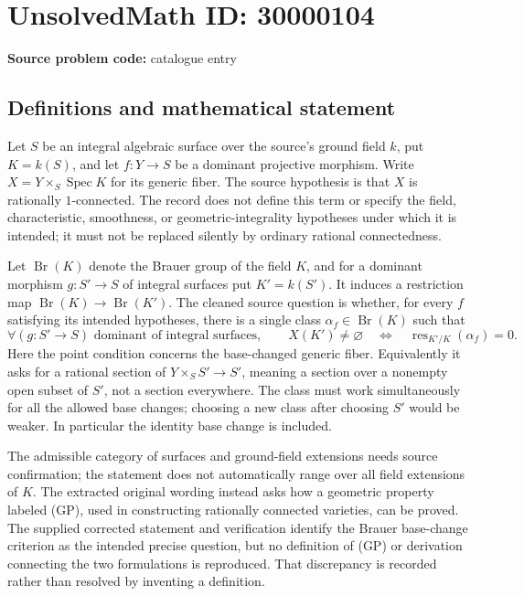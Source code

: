\documentclass[11pt]{article}
\begin{document}
\section*{UnsolvedMath ID: 30000104}
\textbf{Source problem code:} catalogue entry
\subsection{Definitions and mathematical statement}
Let \(S\) be an integral algebraic surface over the source's ground field \(k\), put \(K=k(S)\), and let \(f:Y\to S\) be a dominant projective morphism. Write \(X=Y\times_S\operatorname{Spec}K\) for its generic fiber. The source hypothesis is that \(X\) is rationally \(1\)-connected. The record does not define this term or specify the field, characteristic, smoothness, or geometric-integrality hypotheses under which it is intended; it must not be replaced silently by ordinary rational connectedness.

Let \(\operatorname{Br}(K)\) denote the Brauer group of the field \(K\), and for a dominant morphism \(g:S'\to S\) of integral surfaces put \(K'=k(S')\). It induces a restriction map \(\operatorname{Br}(K)\to\operatorname{Br}(K')\). The cleaned source question is whether, for every \(f\) satisfying its intended hypotheses, there is a single class \(\alpha_f\in\operatorname{Br}(K)\) such that
\[
\forall (g:S'\to S)\text{ dominant of integral surfaces},\qquad
X(K')\ne\varnothing
\quad\Longleftrightarrow\quad
\operatorname{res}_{K'/K}(\alpha_f)=0.
\]
Here the point condition concerns the base-changed generic fiber. Equivalently it asks for a rational section of \(Y\times_S S'\to S'\), meaning a section over a nonempty open subset of \(S'\), not a section everywhere. The class must work simultaneously for all the allowed base changes; choosing a new class after choosing \(S'\) would be weaker. In particular the identity base change is included.

The admissible category of surfaces and ground-field extensions needs source confirmation; the statement does not automatically range over all field extensions of \(K\). The extracted original wording instead asks how a geometric property labeled (GP), used in constructing rationally connected varieties, can be proved. The supplied corrected statement and verification identify the Brauer base-change criterion as the intended precise question, but no definition of (GP) or derivation connecting the two formulations is reproduced. That discrepancy is recorded rather than resolved by inventing a definition.
\end{document}
